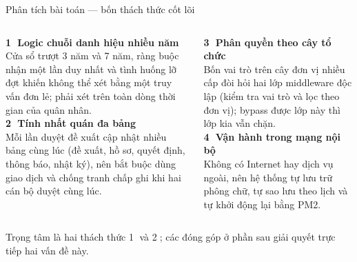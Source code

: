 \documentclass[aspectratio=43,xcolor=table]{beamer}
\begin{document}
\begin{frame}{Phân tích bài toán --- bốn thách thức cốt lõi}
  \begin{columns}[T,onlytextwidth]
    \textbf{\textcolor{hustred}{\textcircled{1} Logic chuỗi danh hiệu nhiều năm}}\\
    \scriptsize Cửa sổ trượt 3 năm và 7 năm, ràng buộc nhận một lần duy nhất và tình huống lỡ đợt khiến không thể xét bằng một truy vấn đơn lẻ; phải xét trên toàn dòng thời gian của quân nhân.\\[0.3cm]

    \textbf{\textcolor{hustred}{\textcircled{2} Tính nhất quán đa bảng}}\\
    \scriptsize Mỗi lần duyệt đề xuất cập nhật nhiều bảng cùng lúc (đề xuất, hồ sơ, quyết định, thông báo, nhật ký), nên bắt buộc dùng giao dịch và chống tranh chấp ghi khi hai cán bộ duyệt cùng lúc.

    \textbf{\textcolor{hustred}{\textcircled{3} Phân quyền theo cây tổ chức}}\\
    \scriptsize Bốn vai trò trên cây đơn vị nhiều cấp đòi hỏi hai lớp middleware độc lập (kiểm tra vai trò và lọc theo đơn vị); bypass được lớp này thì lớp kia vẫn chặn.\\[0.3cm]

    \textbf{\textcolor{hustred}{\textcircled{4} Vận hành trong mạng nội bộ}}\\
    \scriptsize Không có Internet hay dịch vụ ngoài, nên hệ thống tự lưu trữ phông chữ, tự sao lưu theo lịch và tự khởi động lại bằng PM2.
  \end{columns}

  \vspace{0.4cm}
  \begin{block}{}
    \centering\small Trọng tâm là hai thách thức \textcircled{1} và \textcircled{2}; các đóng góp ở phần sau giải quyết trực tiếp hai vấn đề này.
  \end{block}
\end{frame}
\end{document}
